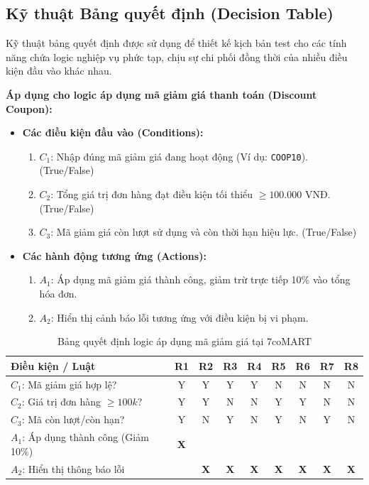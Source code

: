 \subsection{Kỹ thuật Bảng quyết định (Decision Table)}
Kỹ thuật bảng quyết định được sử dụng để thiết kế kịch bản test cho các tính năng chứa logic nghiệp vụ phức tạp, chịu sự chi phối đồng thời của nhiều điều kiện đầu vào khác nhau.

\noindent\textbf{Áp dụng cho logic áp dụng mã giảm giá thanh toán (Discount Coupon):}
\begin{itemize}
    \item \textbf{Các điều kiện đầu vào (Conditions):}
    \begin{enumerate}
        \item $C_1$: Nhập đúng mã giảm giá đang hoạt động (Ví dụ: \texttt{COOP10}). (True/False)
        \item $C_2$: Tổng giá trị đơn hàng đạt điều kiện tối thiểu $\ge 100.000$ VNĐ. (True/False)
        \item $C_3$: Mã giảm giá còn lượt sử dụng và còn thời hạn hiệu lực. (True/False)
    \end{enumerate}
    \item \textbf{Các hành động tương ứng (Actions):}
    \begin{enumerate}
        \item $A_1$: Áp dụng mã giảm giá thành công, giảm trừ trực tiếp 10\% vào tổng hóa đơn.
        \item $A_2$: Hiển thị cảnh báo lỗi tương ứng với điều kiện bị vi phạm.
    \end{enumerate}
\end{itemize}

\begin{table}[H]
\centering
\caption{Bảng quyết định logic áp dụng mã giảm giá tại 7coMART}
\renewcommand{\arraystretch}{1.2}
\begin{tabular}{|l|c|c|c|c|c|c|c|c|}
\hline
\textbf{Điều kiện / Luật} & \textbf{R1} & \textbf{R2} & \textbf{R3} & \textbf{R4} & \textbf{R5} & \textbf{R6} & \textbf{R7} & \textbf{R8} \\ \hline
$C_1$: Mã giảm giá hợp lệ? & Y & Y & Y & Y & N & N & N & N \\ \hline
$C_2$: Giá trị đơn hàng $\ge 100k$? & Y & Y & N & N & Y & Y & N & N \\ \hline
$C_3$: Mã còn lượt/còn hạn? & Y & N & Y & N & Y & N & Y & N \\ \hline
\hline
$A_1$: Áp dụng thành công (Giảm 10\%) & \cellcolor{green!20}\textbf{X} & & & & & & & \\ \hline
$A_2$: Hiển thị thông báo lỗi & & \cellcolor{red!20}\textbf{X} & \cellcolor{red!20}\textbf{X} & \cellcolor{red!20}\textbf{X} & \cellcolor{red!20}\textbf{X} & \cellcolor{red!20}\textbf{X} & \cellcolor{red!20}\textbf{X} & \cellcolor{red!20}\textbf{X} \\ \hline
\end{tabular}
\end{table}

